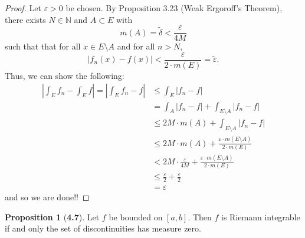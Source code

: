 \documentclass[12pt]{article}
\newcommand{\N}{\mathbb{N}}
\renewcommand{\epsilon}{\varepsilon}
\theoremstyle{definition}
\newtheorem*{prop}{Proposition}
\begin{document}
  \begin{proof}
    Let \( \epsilon > 0 \) be chosen. By Proposition 3.23 (Weak Ergoroff's Theorem), there exists \( N \in \N \) and \( A \subset E \) with 
      \[
        m(A) = \tilde{\delta} < \frac{\epsilon}{4M}
      \]
    such that that for all \( x \in E \setminus A \) and for all \( n > N \),
      \[
          \left| f_n(x) - f(x) \right| < \frac{\epsilon}{2 \cdot m(E)} = \tilde{\epsilon}.
      \]
    Thus, we can show the following:
    \begin{align*}
        \left| \int_{E} f_n - \int_{E} f \right| = \left| \int_{E} f_n - f \right| 
        &\leq \int_{E} \left| f_n - f \right| \\
        &= \int_{A} |f_n - f| + \int_{E \setminus A} |f_n - f| \\
        &\leq 2M \cdot m(A) + \int_{E \setminus A} |f_n - f| \\
        &\leq 2M \cdot m(A) + \frac{\epsilon \cdot  m(E \setminus A)}{2 \cdot m(E)} \\
        &< 2M \cdot \frac{\epsilon}{4 M} + \frac{\epsilon \cdot m(E \setminus A)}{2 \cdot m(E)} \\ 
        &\leq \frac{\epsilon}{2} + \frac{\epsilon}{2} \\
        &= \epsilon
    \end{align*}
  and so we are done!!
  \end{proof}

\begin{prop}[\textbf{4.7}]
  Let \( f \) be bounded on \( [a, b] \). Then \( f \) is Riemann integrable if and only the set of discontinuities has measure zero. 
  
\end{prop}
\end{document}
